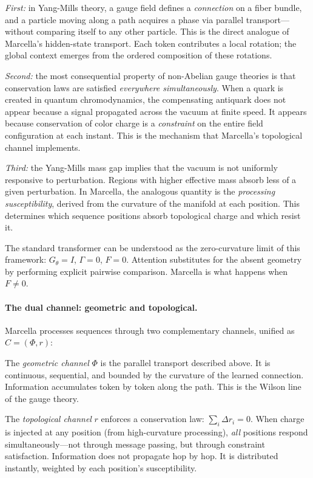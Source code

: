 \documentclass[11pt,a4paper]{article}
\theoremstyle{definition}
\theoremstyle{remark}
\begin{document}
\emph{First:} in Yang-Mills theory, a gauge field defines a \emph{connection} on a fiber bundle, and a particle moving along a path acquires a phase via parallel transport---without comparing itself to any other particle. This is the direct analogue of Marcella's hidden-state transport. Each token contributes a local rotation; the global context emerges from the ordered composition of these rotations.

\emph{Second:} the most consequential property of non-Abelian gauge theories is that conservation laws are satisfied \emph{everywhere simultaneously}. When a quark is created in quantum chromodynamics, the compensating antiquark does not appear because a signal propagated across the vacuum at finite speed. It appears because conservation of color charge is a \emph{constraint} on the entire field configuration at each instant. This is the mechanism that Marcella's topological channel implements.

\emph{Third:} the Yang-Mills mass gap implies that the vacuum is not uniformly responsive to perturbation. Regions with higher effective mass absorb less of a given perturbation. In Marcella, the analogous quantity is the \emph{processing susceptibility}, derived from the curvature of the manifold at each position. This determines which sequence positions absorb topological charge and which resist it.

The standard transformer can be understood as the zero-curvature limit of this framework: $G_\theta = I$, $\Gamma = 0$, $F = 0$. Attention substitutes for the absent geometry by performing explicit pairwise comparison. Marcella is what happens when $F \neq 0$.

\paragraph{The dual channel: geometric and topological.}
Marcella processes sequences through two complementary channels, unified as $C = (\Phi, r)$:

The \emph{geometric channel} $\Phi$ is the parallel transport described above. It is continuous, sequential, and bounded by the curvature of the learned connection. Information accumulates token by token along the path. This is the Wilson line of the gauge theory.

The \emph{topological channel} $r$ enforces a conservation law: $\sum_i \Delta r_i = 0$. When charge is injected at any position (from high-curvature processing), \emph{all} positions respond simultaneously---not through message passing, but through constraint satisfaction. Information does not propagate hop by hop. It is distributed instantly, weighted by each position's susceptibility.
\end{document}
